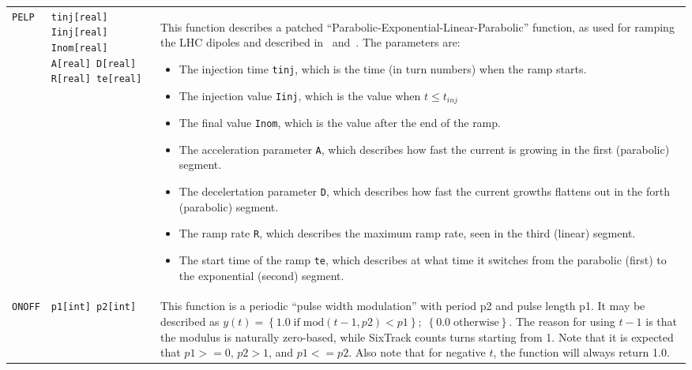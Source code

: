 \begin{center}
\begin{longtable}{|p{1.8cm} | p{4.1cm} | p{9.5cm}|}
    \rowcolor{blue!15}
    \multicolumn{3}{|l|}{Specialized functions} \\*
    \hline
    
    \texttt{PELP} & \texttt{tinj[real] Iinj[real] Inom[real] A[real] D[real] R[real] te[real]} & 
    This function describes a patched ``Parabolic-Exponential-Linear-Parabolic'' function, as used for ramping the LHC dipoles and described in~\cite[Appendix C]{SRussen:fieldComp} and~\cite{BurlaKing:CurrentRamp}. 
    The parameters are:
    \begin{itemize}
    \setlength\itemsep{-0.3em}
        \item The injection time \texttt{tinj}, which is the time (in turn numbers) when the ramp starts.
        \item The injection value \texttt{Iinj}, which is the value when $t\le t_{inj}$
        \item The final value \texttt{Inom}, which is the value after the end of the ramp.
        \item The acceleration parameter \texttt{A}, which describes how fast the current is growing in the first (parabolic) segment.
        \item The decelertation parameter \texttt{D}, which describes how fast the current growths flattens out in the forth (parabolic) segment.
        \item The ramp rate \texttt{R}, which describes the maximum ramp rate, seen in the third (linear) segment.
        \item The start time of the ramp \texttt{te}, which describes at what time it switches from the parabolic (first) to the exponential (second) segment.
    \end{itemize}
    \\*
    \hline
    
    \texttt{ONOFF} & \texttt{p1[int] p2[int]} &
    This function is a periodic ``pulse width modulation'' with period p2 and pulse length p1.
    It may be described as
    $y(t) =  \left\{1.0 \; \mathrm{if} \; \mathrm{mod}(t-1,p2) < p1 \right\}; \; \left\{ 0.0 \; \mathrm{otherwise} \right\}$.
    The reason for using $t-1$ is that the modulus is naturally zero-based, while SixTrack counts turns starting from 1.
    Note that it is expected that $p1 >= 0$, $p2 > 1$, and $p1 <= p2$.
    Also note that for negative $t$, the function will always return 1.0.
\end{longtable}
\normalsize
\end{center}

